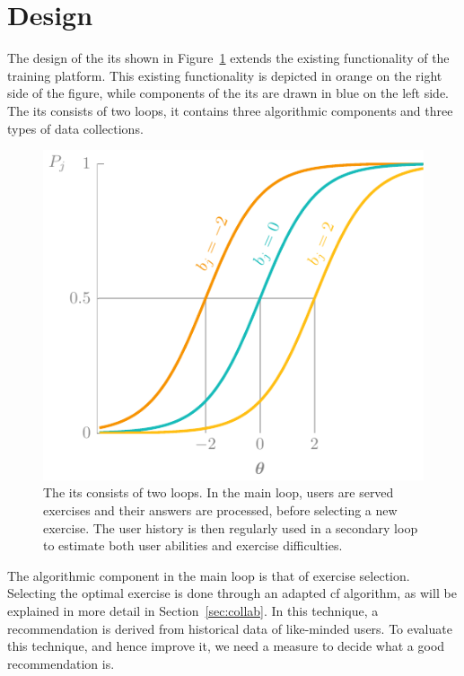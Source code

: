\section{Design}
\label{sec:design}
The design of the \gls{its} shown in Figure~\ref{fig:its-overview} extends the existing functionality of the training platform.
This existing functionality is depicted in orange on the right side of the figure, while components of the \gls{its} are drawn in blue on the left side.
The \gls{its} consists of two loops, it contains three algorithmic components and three types of data collections.

\begin{figure}
    \centering
    \includegraphics[page=12]{03-education/figures/tikzfigures.pdf}
  \caption[Design of the ITS]{The \Gls{its} consists of two loops. In the main loop, users are served exercises and their answers are processed, before selecting a new exercise. The user history is then regularly used in a secondary loop to estimate both user abilities and exercise difficulties.}
  \label{fig:its-overview} 
\end{figure}

The algorithmic component in the main loop is that of exercise selection.
Selecting the optimal exercise is done through an adapted \gls{cf} algorithm, as will be explained in more detail in Section~\ref{sec:collab}.
In this technique, a recommendation is derived from historical data of like-minded users.
To evaluate this technique, and hence improve it, we need a measure to decide what a good recommendation is.

